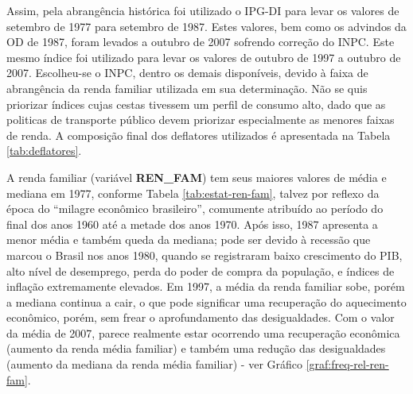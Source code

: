 Assim, pela abrangência histórica foi utilizado o IPG-DI para levar os valores de setembro de 1977 para setembro de 1987. Estes valores, bem como os advindos da OD de 1987, foram levados a outubro de 2007 sofrendo correção do INPC. Este mesmo índice foi utilizado para levar os valores de outubro de 1997 a outubro de 2007. Escolheu-se o INPC, dentro os demais disponíveis, devido à faixa de abrangência da renda familiar utilizada em sua determinação. Não se quis priorizar índices cujas cestas tivessem um perfil de consumo alto, dado que as politicas de transporte público devem priorizar especialmente as menores faixas de renda. A composição final dos deflatores utilizados é apresentada na Tabela \ref{tab:deflatores}.

\begin{table}[htb]

\end{table}


A renda familiar (variável \textbf{REN_FAM}) tem seus maiores valores de média e mediana em 1977, conforme Tabela \ref{tab:estat-ren-fam}, talvez por reflexo da época do ``milagre econômico brasileiro'', %
comumente atribuído ao período do final dos anos 1960 até a metade dos anos 1970.
Após isso, 1987 apresenta a menor média e também queda da mediana; pode ser devido à recessão que marcou o Brasil nos anos 1980, quando se registraram baixo crescimento do PIB, %
alto nível de desemprego, %
perda do poder de compra da população, %
e índices de inflação extremamente elevados. %
Em 1997, a média da renda familiar sobe, porém a mediana continua a cair, o que pode significar uma recuperação do aquecimento econômico, porém, sem frear o aprofundamento das desigualdades. %
Com o valor da média de 2007, parece realmente estar ocorrendo uma recuperação econômica (aumento da renda média familiar) e também uma redução das desigualdades (aumento da mediana da renda média familiar) - ver Gráfico \ref{graf:freq-rel-ren-fam}.


